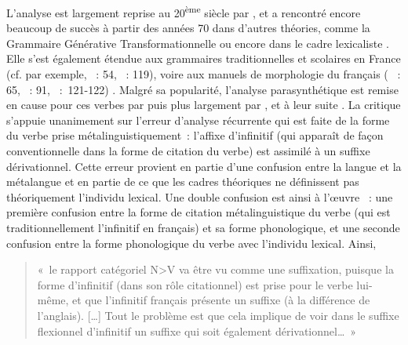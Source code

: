 \documentclass[output=paper]{langsci/langscibook}
\begin{document}
L'analyse est largement reprise au 20\textsuperscript{ème} siècle par
%
\citet[215]{Nyrop36}%
%
, et a rencontré encore beaucoup de succès à partir des
années 70 dans d'autres théories, comme la Grammaire Générative
Transformationnelle %
\citep{dubois62,Guilbert1975,Zribi-Hertz72,Scalise1994} %
%
ou encore dans le cadre lexicaliste %
\citep{booij1977.dutch-morphology}%
%
. Elle
s'est également étendue aux grammaires traditionnelles %
\citep[253]{Grevisse1988} %
%
et scolaires en France %
(cf. par exemple, %
\citealt{Chevalier64}%
%
~: 54, %
\citealt{Bechade92}%
%
~: 119), voire aux manuels de morphologie du français (%
\citealt{Gardes-Tamine1988}%
%
~: 65, %
\citealt{Apotheloz2002}%
%
~: 91, %
\citealt{Huot06}
~:~121-122)
%
.
Malgré sa popularité, l'analyse parasynthétique est remise en cause pour
ces verbes par %
\citet[201--202]{Dell70} %
%
puis plus largement par %
\citet[121--139]{Corbin87}%
, et à leur suite %
\citet[288-307]{Fradin03}%
%
. La critique
s'appuie unanimement sur l'erreur d'analyse récurrente qui est faite de
la forme du verbe prise métalinguistiquement~: l'affixe d'infinitif (qui
apparaît de façon conventionnelle dans la forme de citation du verbe)
est assimilé à un suffixe dérivationnel. Cette erreur provient en partie
d'une confusion entre la langue et la métalangue %
\citep[124]{Corbin87} %
%
et
en partie de ce que les cadres théoriques ne définissent pas
théoriquement l'individu lexical. Une double confusion est ainsi à
l'œuvre %
\citep{Kerleroux2000}%
%
~: une première confusion entre la forme de
citation métalinguistique du verbe (qui est traditionnellement
l'infinitif en français) et sa forme phonologique, et une seconde
confusion entre la forme phonologique du verbe avec l'individu lexical.
Ainsi,

\begin{quotation}
«~le rapport catégoriel N\textgreater{}V va être vu comme une
suffixation, puisque la forme d'infinitif (dans son rôle citationnel)
est prise pour le verbe lui-même, et que l'infinitif français présente
un suffixe (à la différence de l'anglais). {[}\ldots{}{]} Tout le
problème est que cela implique de voir dans le suffixe flexionnel
d'infinitif un suffixe qui soit également dérivationnel\ldots{}~»
%
\citep[9]{Kerleroux2000}%
%
\end{quotation}
\end{document}
